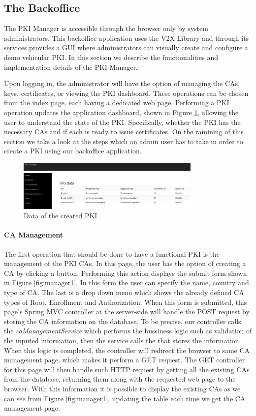 \subsection{The Backoffice}
The PKI Manager is accessible through the browser only by system administrators. This backoffice application uses the V2X Library and through its services provides a GUI where administrators can visually create and configure a demo vehicular PKI. In this section we describe the functionalities and implementation details of the PKI Manager.

Upon logging in, the administrator will have the option of managing the CAs, keys, certificates, or viewing the PKI dashboard. These operations can be chosen from the index page, each having a dedicated web page. Performing a PKI operation updates the application dashboard, shown in Figure \ref{fig:manager10}, allowing the user to understand the state of the PKI. Specifically, whether the PKI has the necessary CAs and if each is ready to issue certificates. On the ramining of this section we take a look at the steps which an admin user has to take in order to create a PKI using our backoffice application.

\begin{figure}
	\centering
	\includegraphics[width=0.8\textwidth]{Figures/manager10}
	\caption{\label{fig:manager10} Data of the created PKI}
\end{figure}

\paragraph{CA Management}
The first operation that should be done to have a functional PKI is the management of the PKI CAs. In this page, the user has the option of creating a CA by clicking a button. Performing this action displays the submit form shown in Figure \ref{fig:manager1}. In this form the user can specify the name, country and type of CA. The last is a drop down menu which shows the already defined CA types of Root, Enrollment and Authorization. When this form is submitted, this page's Spring MVC controller at the server-side will handle the POST request by storing the CA information on the database. To be precise, our controller calls the \textit{caManagementService} which performs the bussiness logic such as validation of the inputed information, then the service calls the  that stores the information. When this logic is completed, the controller will redirect the browser to same CA management page, which makes it perform a GET request. The GET controller for this page will then handle such HTTP request by getting all the existing CAs from the database, returning them along with the requested web page to the browser. With this information it is possible to display the existing CAs as we can see from Figure \ref{fig:manager1}, updating the table each time we get the CA management page. 

